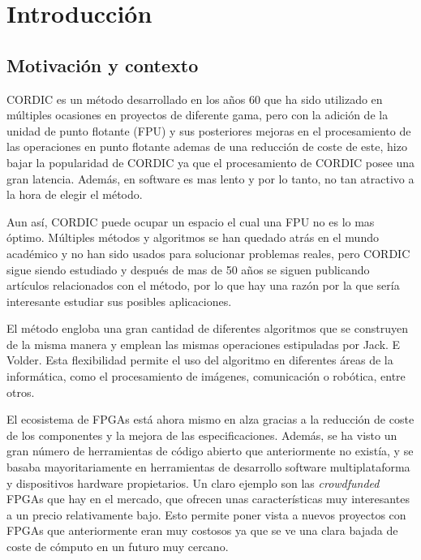 
\chapter{Introducción}
\section{Motivación y contexto}
\label{motivacion}

CORDIC es un método desarrollado en los años 60 que ha sido utilizado en múltiples ocasiones en proyectos de diferente gama, pero con la adición de la unidad de punto flotante (FPU) y sus posteriores mejoras en el procesamiento de las operaciones en punto flotante ademas de una reducción de coste de este, hizo bajar la popularidad de CORDIC ya que el procesamiento de CORDIC posee una gran latencia. Además, en software es mas lento y por lo tanto, no tan atractivo a la hora de elegir el método.

Aun así, CORDIC puede ocupar un espacio el cual una FPU no es lo mas óptimo. Múltiples métodos y algoritmos se han quedado atrás en el mundo académico y no han sido usados para solucionar problemas reales, pero CORDIC sigue siendo estudiado y después de mas de 50 años se siguen publicando artículos relacionados con el método, por lo que hay una razón por la que sería interesante estudiar sus posibles aplicaciones.

El método engloba una gran cantidad de diferentes algoritmos que se construyen de la misma manera y emplean las mismas operaciones estipuladas por Jack. E Volder. Esta flexibilidad permite el uso del algoritmo en diferentes áreas de la informática, como el procesamiento de imágenes, comunicación o robótica, entre otros.

El ecosistema de FPGAs está ahora mismo en alza gracias a la reducción de coste de los componentes y la mejora de las especificaciones. Además, se ha visto un gran número de herramientas de código abierto que anteriormente no existía, y se basaba mayoritariamente en herramientas de desarrollo software multiplataforma y dispositivos hardware propietarios. Un claro ejemplo son las \textit{crowdfunded} FPGAs que hay en el mercado, que ofrecen unas características muy interesantes a un precio relativamente bajo. Esto permite poner vista a nuevos proyectos con FPGAs que anteriormente eran muy costosos ya que se ve una clara bajada de coste de cómputo en un futuro muy cercano.

